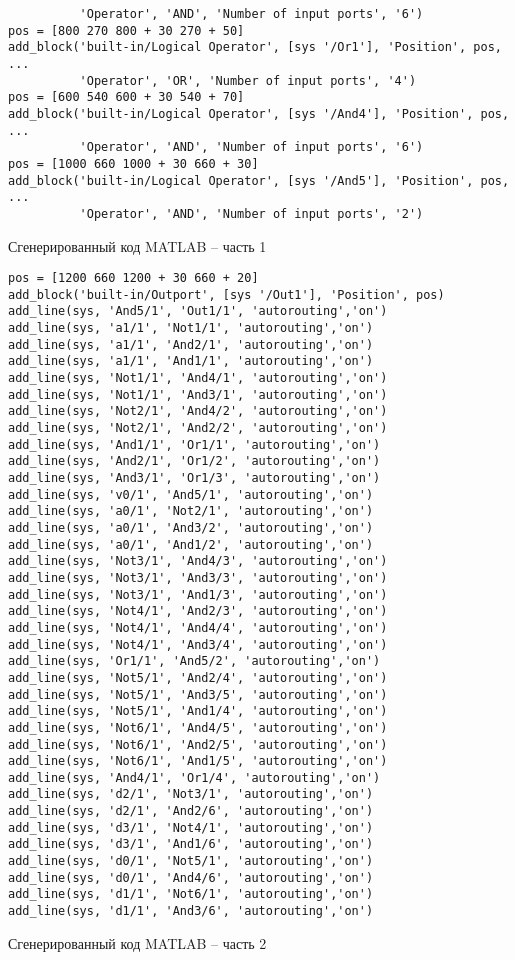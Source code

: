 \documentclass[document.tex]{subfiles}
\begin{document}
\begin{listing}[ht]
\begin{verbatim}
          'Operator', 'AND', 'Number of input ports', '6')
pos = [800 270 800 + 30 270 + 50]
add_block('built-in/Logical Operator', [sys '/Or1'], 'Position', pos, ...
          'Operator', 'OR', 'Number of input ports', '4')
pos = [600 540 600 + 30 540 + 70]
add_block('built-in/Logical Operator', [sys '/And4'], 'Position', pos, ...
          'Operator', 'AND', 'Number of input ports', '6')
pos = [1000 660 1000 + 30 660 + 30]
add_block('built-in/Logical Operator', [sys '/And5'], 'Position', pos, ...
          'Operator', 'AND', 'Number of input ports', '2')
\end{verbatim}
\caption{Сгенерированный код MATLAB -- часть 1}
\label{lst:extmatlabgencode1}
\end{listing}

\clearpage

\begin{listing}[ht]
\begin{verbatim}
pos = [1200 660 1200 + 30 660 + 20]
add_block('built-in/Outport', [sys '/Out1'], 'Position', pos)
add_line(sys, 'And5/1', 'Out1/1', 'autorouting','on')
add_line(sys, 'a1/1', 'Not1/1', 'autorouting','on')
add_line(sys, 'a1/1', 'And2/1', 'autorouting','on')
add_line(sys, 'a1/1', 'And1/1', 'autorouting','on')
add_line(sys, 'Not1/1', 'And4/1', 'autorouting','on')
add_line(sys, 'Not1/1', 'And3/1', 'autorouting','on')
add_line(sys, 'Not2/1', 'And4/2', 'autorouting','on')
add_line(sys, 'Not2/1', 'And2/2', 'autorouting','on')
add_line(sys, 'And1/1', 'Or1/1', 'autorouting','on')
add_line(sys, 'And2/1', 'Or1/2', 'autorouting','on')
add_line(sys, 'And3/1', 'Or1/3', 'autorouting','on')
add_line(sys, 'v0/1', 'And5/1', 'autorouting','on')
add_line(sys, 'a0/1', 'Not2/1', 'autorouting','on')
add_line(sys, 'a0/1', 'And3/2', 'autorouting','on')
add_line(sys, 'a0/1', 'And1/2', 'autorouting','on')
add_line(sys, 'Not3/1', 'And4/3', 'autorouting','on')
add_line(sys, 'Not3/1', 'And3/3', 'autorouting','on')
add_line(sys, 'Not3/1', 'And1/3', 'autorouting','on')
add_line(sys, 'Not4/1', 'And2/3', 'autorouting','on')
add_line(sys, 'Not4/1', 'And4/4', 'autorouting','on')
add_line(sys, 'Not4/1', 'And3/4', 'autorouting','on')
add_line(sys, 'Or1/1', 'And5/2', 'autorouting','on')
add_line(sys, 'Not5/1', 'And2/4', 'autorouting','on')
add_line(sys, 'Not5/1', 'And3/5', 'autorouting','on')
add_line(sys, 'Not5/1', 'And1/4', 'autorouting','on')
add_line(sys, 'Not6/1', 'And4/5', 'autorouting','on')
add_line(sys, 'Not6/1', 'And2/5', 'autorouting','on')
add_line(sys, 'Not6/1', 'And1/5', 'autorouting','on')
add_line(sys, 'And4/1', 'Or1/4', 'autorouting','on')
add_line(sys, 'd2/1', 'Not3/1', 'autorouting','on')
add_line(sys, 'd2/1', 'And2/6', 'autorouting','on')
add_line(sys, 'd3/1', 'Not4/1', 'autorouting','on')
add_line(sys, 'd3/1', 'And1/6', 'autorouting','on')
add_line(sys, 'd0/1', 'Not5/1', 'autorouting','on')
add_line(sys, 'd0/1', 'And4/6', 'autorouting','on')
add_line(sys, 'd1/1', 'Not6/1', 'autorouting','on')
add_line(sys, 'd1/1', 'And3/6', 'autorouting','on')
\end{verbatim}
\caption{Сгенерированный код MATLAB -- часть 2}
\label{lst:extmatlabgencode2}
\end{listing}
\end{document}
